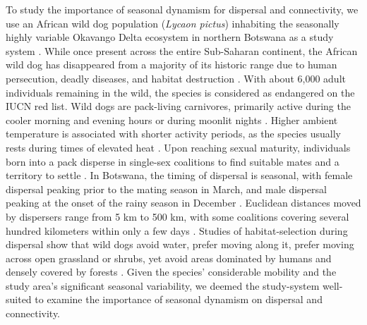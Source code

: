 \documentclass[../FinalThesis.tex]{subfiles}
\begin{document}

To study the importance of seasonal dynamism for dispersal and connectivity, we
use an African wild dog population (\textit{Lycaon pictus}) inhabiting the
seasonally highly variable Okavango Delta ecosystem in northern Botswana as a
study system \citep{McNutt.1996, Wolski.2017}. While once present across the
entire Sub-Saharan continent, the African wild dog has disappeared from a
majority of its historic range due to human persecution, deadly diseases, and
habitat destruction \citep{Woodroffe.2020a}. With about 6,000 adult individuals
remaining in the wild, the species is considered as endangered on the IUCN red
list. Wild dogs are pack-living carnivores, primarily active during the cooler
morning and evening hours \citep{Rasmussen.2012} or during moonlit nights
\citep{Cozzi.2012}. Higher ambient temperature is associated with shorter
activity periods, as the species usually rests during times of elevated heat
\citep{Rabaiotti.2019}. Upon reaching sexual maturity, individuals born into a
pack disperse in single-sex coalitions to find suitable mates and a territory to
settle \citep{McNutt.1996}. In Botswana, the timing of dispersal is seasonal,
with female dispersal peaking prior to the mating season in March, and male
dispersal peaking at the onset of the rainy season in December
\citep{Behr.2020}. Euclidean distances moved by dispersers range from 5 km to
500 km, with some coalitions covering several hundred kilometers within only a
few days \citep{Davies-Mostert.2012, Masenga.2016, Cozzi.2020,
Sandoval-Seres.2022}. Studies of habitat-selection during dispersal show that
wild dogs avoid water, prefer moving along it, prefer moving across open
grassland or shrubs, yet avoid areas dominated by humans and densely covered by
forests \citep{ONeill.2020, Hofmann.2021}. Given the species' considerable
mobility and the study area's significant seasonal variability, we deemed the
study-system well-suited to examine the importance of seasonal dynamism on
dispersal and connectivity.
\end{document}
